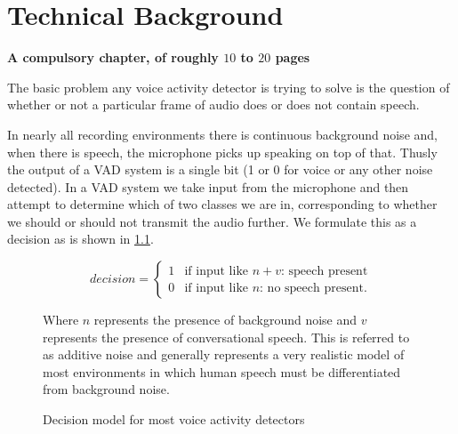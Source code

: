 \documentclass[ %
                    author={Sam Phippen},
                supervisor={Dr. Rafal Bogacz},
                     title={Real time voice activity detectors in noisy personal computing environments},
                  subtitle={},
                    degree={MEng},
                      year={2012} ]{thesis}
\begin{document}

\chapter{Technical Background}
\label{chap:technical}

{\bf A compulsory chapter, of roughly $10$ to $20$ pages} 
\vspace{1cm} 

\noindent

%

The basic problem any voice activity detector is trying to solve is the
question of whether or not a particular frame of audio does or does not contain
speech.

In nearly all recording environments there is continuous background noise and,
when there is speech, the microphone picks up speaking on top of that. Thusly
the output of a VAD system is a single bit (1 or 0 for voice or any other noise
detected). In a VAD system we take input from the microphone and then attempt
to determine which of two classes we are in, corresponding to whether we
should or should not transmit the audio further. We formulate this as a
decision as is shown in \ref{eqn:decision 1}.

\begin{figure}
        \[ decision = \left\{ \begin{array}{ll}
                    1 & \mbox{if input like $n + v$: speech present}\\
            0 & \mbox{if input like $n$: no speech present}.\end{array} \right. \]


                    Where $n$ represents the presence of background noise and $v$ represents the
                    presence of conversational speech. This is referred to as additive
                    noise\cite{sohn} and generally represents a very realistic model of most
                    environments in which human speech must be differentiated from background noise.

                    \label{eqn:decision 1}
                    \caption{Decision model for most voice activity detectors}

\end{figure}
\end{document}
